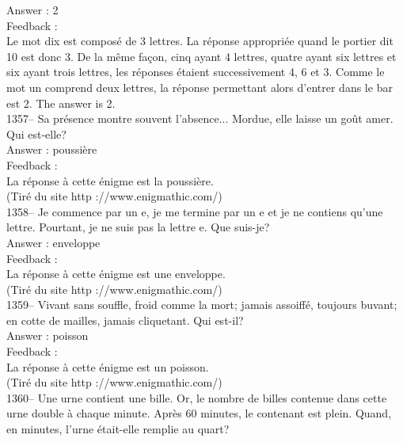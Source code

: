 \documentclass[letterpaper, 12pt]{article}
\begin{document}
Answer : 2\\

Feedback : \\
Le mot dix est compos\'e de 3 lettres. La r\'eponse appropri\'ee
quand le portier dit 10 est donc 3. De la m\^eme fa\c con, cinq
ayant 4 lettres, quatre ayant six lettres et six ayant trois
lettres, les r\'eponses \'etaient successivement 4, 6 et 3. Comme le
mot un comprend deux lettres, la r\'eponse permettant alors d'entrer
dans le bar est 2.
The answer is 2.\\

1357--  Sa pr\'esence montre souvent l'absence... Mordue, elle laisse un
go\^ut amer.  Qui est-elle?\\

Answer : poussi\`ere\\

Feedback : \\
La r\'eponse \`a cette \'enigme est la poussi\`ere.\\
(Tir\'e du site http ://www.enigmathic.com/)\\

1358-- Je commence par un e, je me termine par un e et je ne contiens qu'une
lettre.  Pourtant, je ne suis pas la lettre e. Que suis-je?\\

Answer : enveloppe\\

Feedback : \\
La r\'eponse \`a cette \'enigme est une enveloppe.\\
(Tir\'e du site http ://www.enigmathic.com/)\\

1359-- Vivant sans souffle, froid comme la mort; jamais assoiff\'e, toujours
buvant; en cotte de mailles, jamais cliquetant. Qui est-il?\\

Answer : poisson\\

Feedback :\\
La r\'eponse \`a cette \'enigme est un poisson.\\
(Tir\'e du site http ://www.enigmathic.com/)\\

1360--  Une urne contient une bille.  Or, le nombre de billes contenue dans
cette urne double \`a chaque minute. Apr\`es 60 minutes, le contenant est
plein.  Quand, en minutes, l'urne \'etait-elle remplie au quart?\\
\end{document}
